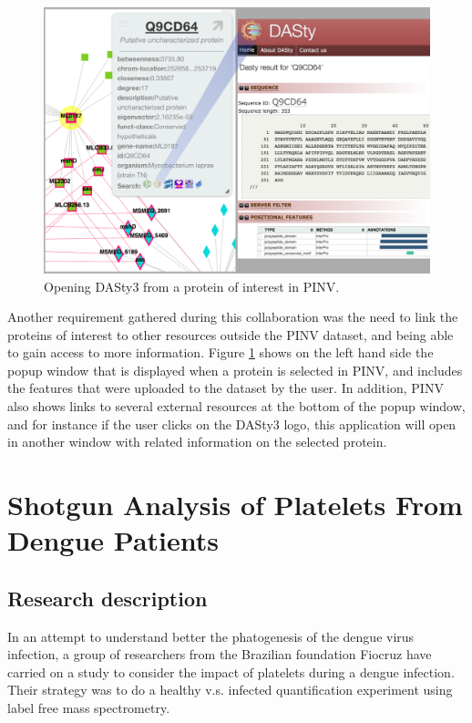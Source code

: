 \begin{figure}
\centering
\includegraphics[width=5in]{figures/pinv2dasty.png}
\caption[Opening DASty3 from a protein of interest in PINV.]{Opening DASty3 from a protein of interest in PINV.
\label{fig:pinv2dasty}}
\end{figure}

Another requirement gathered during this collaboration was the need to link the proteins of interest to other resources outside the PINV dataset, and being able to gain access to more information. Figure \ref{fig:pinv2dasty} shows on the left hand side the popup window that is displayed when a protein is selected in PINV, and includes the features that were uploaded to the dataset by the user. In addition, PINV also shows links to several external resources at the bottom of the popup window, and for instance if the user clicks on the DASty3 logo, this application will open in another window with related information on the selected protein.

\section{Shotgun Analysis of Platelets From Dengue Patients}
\label{sec:dengue}
\subsection{Research description}
In an attempt to understand better the phatogenesis of the dengue virus infection, a group of researchers from the Brazilian foundation Fiocruz have carried on a study to consider the impact of platelets during a dengue infection. Their strategy was to do a healthy v.s. infected quantification experiment using label free mass spectrometry.

